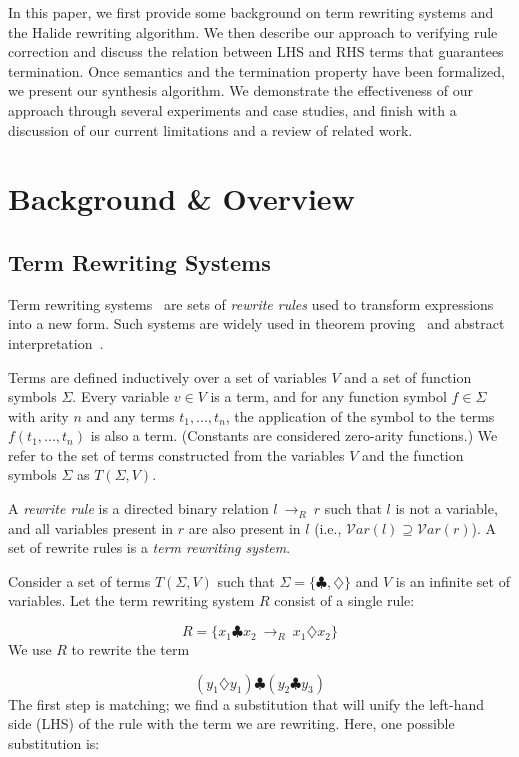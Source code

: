 \documentclass[acmsmall,review,anonymous]{acmart}\settopmatter{printfolios=true,printccs=false,printacmref=false}
\newcommand{\rewrites}[0]{\:\rightarrow_{R}\:}
\begin{document}
In this paper, we first provide some background on term rewriting systems and the Halide rewriting algorithm. We then describe our approach to verifying rule correction and discuss the relation between LHS and RHS terms that guarantees termination. Once semantics and the termination property have been formalized, we present our synthesis algorithm. We demonstrate the effectiveness of our approach through several experiments and case studies, and finish with a discussion of our current limitations and a review of related work.

\section{Background \& Overview}
\subsection{Term Rewriting Systems}
Term rewriting systems~\cite{gorn1967} are sets of \textit{rewrite rules} used to transform expressions into a new form.  Such systems are widely
used in theorem proving~\cite{baader1999term} and abstract interpretation~\cite{cousot1977abstract, cousot1979systematic}.

Terms are defined inductively over a set of variables $V$ and a set of function symbols $\Sigma$. Every variable $v \in V$ is a term, and for any function symbol $f \in \Sigma$ with arity $n$ and any terms $t_1, ..., t_n$, the application of the symbol to the terms $f(t_1, ..., t_n)$ is also a term. (Constants are considered zero-arity functions.) We refer to the set of terms constructed from the variables $V$ and the function symbols $\Sigma$ as $T(\Sigma, V)$.

A \emph{rewrite rule} is a directed binary relation $l \rewrites r$ such that $l$ is not a variable, and all variables present in $r$ are also present in $l$ (i.e., $\mathcal{V}ar(l) \supseteq \mathcal{V}ar(r)$). A set of rewrite rules is a \emph{term rewriting system}.

Consider a set of terms $T(\Sigma, V)$ such that $\Sigma = \{\clubsuit, \diamondsuit\}$ and $V$ is an infinite set of variables. Let the term rewriting system $R$ consist of a single rule:

\[ R = \{ x_1 \clubsuit x_2 \rewrites x_1 \diamondsuit x_2 \} \]
We use $R$ to rewrite the term

\[ 
(y_1 \diamondsuit y_1) \clubsuit (y_2 \clubsuit y_3)
\]
The first step is matching; we find a substitution that will unify the left-hand side (LHS) of the rule with the term we are rewriting. Here, one possible substitution is:
\end{document}
